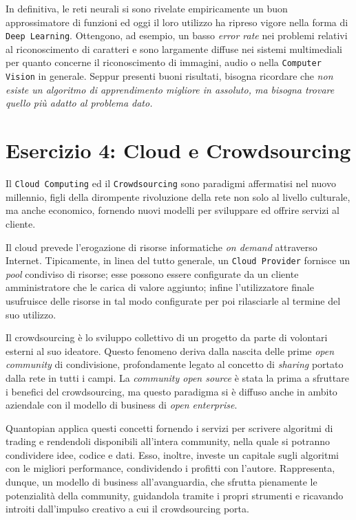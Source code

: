 			In definitiva, le reti neurali si sono rivelate empiricamente un buon approssimatore di funzioni ed oggi il loro utilizzo ha ripreso vigore nella forma di \texttt{Deep Learning}. Ottengono, ad esempio, un basso \emph{error rate} nei problemi relativi al riconoscimento di caratteri e sono largamente diffuse nei sistemi multimediali per quanto concerne il riconoscimento di immagini, audio o nella \texttt{Computer Vision} in generale. Seppur presenti buoni risultati, bisogna ricordare che \emph{non esiste un algoritmo di apprendimento migliore in assoluto, ma bisogna trovare quello più adatto al problema dato.}
			
		\section{Esercizio 4: Cloud e Crowdsourcing}
			\label{sec:es4}
			Il \texttt{Cloud Computing} ed il \texttt{Crowdsourcing} sono paradigmi affermatisi nel nuovo millennio, figli della dirompente rivoluzione della rete non solo al livello culturale, ma anche economico, fornendo nuovi modelli per sviluppare ed offrire servizi al cliente.\par
			Il cloud prevede l'erogazione di risorse informatiche \emph{on demand} attraverso Internet. Tipicamente, in linea del tutto generale, un \texttt{Cloud Provider} fornisce un \emph{pool} condiviso di risorse; esse possono essere configurate da un cliente amministratore che le carica di valore aggiunto; infine l'utilizzatore finale usufruisce delle risorse in tal modo configurate per poi rilasciarle al termine del suo utilizzo.\par
			Il crowdsourcing è lo sviluppo collettivo di un progetto da parte di volontari esterni al suo ideatore. Questo fenomeno deriva dalla nascita delle prime \emph{open community} di condivisione, profondamente legato al concetto di \emph{sharing} portato dalla rete  in tutti i campi. La \emph{community open source} è stata la prima a sfruttare i benefici del crowdsourcing, ma questo paradigma si è diffuso anche in ambito aziendale con il modello di business di \emph{open enterprise}.\par
			Quantopian applica questi concetti fornendo i servizi per scrivere algoritmi di trading e rendendoli disponibili all'intera community, nella quale si potranno condividere idee, codice e dati. Esso, inoltre, investe un capitale sugli algoritmi con le migliori performance, condividendo i profitti con l'autore. Rappresenta, dunque, un modello di business all'avanguardia, che sfrutta pienamente le potenzialità della community, guidandola tramite i propri strumenti e ricavando introiti dall'impulso creativo a cui il crowdsourcing porta.
